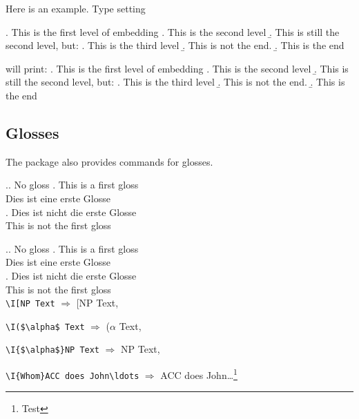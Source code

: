 Here is an example. Type setting

\begin{teX}
\ex. This is the first level of embedding
\a. This is the second level
\b. This is still the second level, but:
\a. This is the third level
\b. This is not the end.
\b. This is the end
\end{teX}

will print:
\ex. This is the first level of embedding
\a. This is the second level
\b. This is still the second level, but:
\a. This is the third level
\b. This is not the end.
\b. This is the end


\subsection{Glosses}
The package also provides commands for glosses.

\begin{teX}
\ex.\a. No gloss
\bg. This is a first gloss\\
Dies ist eine erste Glosse\\

\exg. Dies ist nicht die erste Glosse\\
This is not the first gloss\\
\end{teX}


\ex.\a. No gloss
\bg. This is a first gloss\\
Dies ist eine erste Glosse\\

\exg. Dies ist nicht die erste Glosse\\
This is not the first gloss\\


\medskip
\verb|\I[NP Text| $\Longrightarrow$ \I[NP Text,

 \verb.\I($\alpha$ Text.  $\Longrightarrow$ \I({$\alpha$} Text, 

 \verb.\I{$\alpha$}NP Text. $\Longrightarrow$ \I{$\alpha$}NP Text, 

 \verb.\I{Whom}ACC does John\ldots.  $\Longrightarrow$ ACC 
 does John\ldots \footnote{Test}


%






































